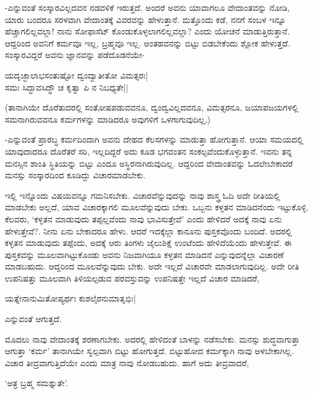 -ಎನ್ನುವಂತೆ ಸಂಸ್ಕಾರವಿಲ್ಲದವನ ನಡವಳಿಕೆ ಇರುತ್ತದೆ. ಅಂದರೆ ಅವನು ಯಾವಾಗಲೂ ವೇದಾಂತವನ್ನು ನೋಡಿ, ಯಾರು ಬಂದರೂ ಸರಳವಾಗಿ ವೇದಾಂತಕ್ಕೆ ವಿವರವನ್ನು ಹೇಳುತ್ತಾನೆ. ಮತ್ತೊಂದು ಕಡೆ, ನನಗೆ ಸಂಬಳ ಇನ್ನೂ ಹೆಚ್ಚಾಗಲಿಲ್ಲವಲ್ಲಾ! ನಾನು ಸೋಫಾಸೆಟ್ ಕೊಂಡುಕೊಳ್ಳಲಾಗಲಿಲ್ಲವಲ್ಲಾ? ಎಂದು ಯೋಚನೆ ಮಾಡುತ್ತಿರುತ್ತಾನೆ. ಆದ್ದರಿಂದ ಅವನಿಗೆ ಕರ್ಮವೂ ಇಲ್ಲ, ಬ್ರಹ್ಮವೂ ಇಲ್ಲ. ಅಂತಹವನನ್ನು ಬಿಟ್ಟು ಬಿಡಬೇಕೆಂದು ಶ್ಲೋಕ ಹೇಳುತ್ತದೆ. ಸಂಸ್ಕಾರವಿದ್ದರೆ ಅವನು ಜ್ಞಾನವನ್ನು ಪಡೆದೊಡನೆಯೇ-

\begin{shloka}
ಯದೃಚ್ಛಾಲಾಭಸಂತುಷ್ಟೋ ದ್ವಂದ್ವಾತೀತೋ ವಿಮತ್ಸರಃ|\\
ಸಮಃ ಸಿದ್ಧಾವಸಿದ್ಧೌ ಚ ಕೃತ್ವಾ ಪಿ ನ ನಿಬಧ್ಯತೇ||
\end{shloka}

(ತಾನಾಗಿಯೇ ದೊರೆತುದರಲ್ಲಿ ಸಂತೋಷಪಡುವವನೂ, ದ್ವಂದ್ವವಿಲ್ಲದವನೂ, ವಿಮತ್ಸರನೂ, ಜಯಾಪಜಯಗಳಲ್ಲಿ ಸಮನಾಗಿರುವವನೂ ಕರ್ಮಗಳನ್ನು ಮಾಡಿದರೂ ಅವುಗಳಿಗೆ ಒಳಗಾಗುವುದಿಲ್ಲ,)

-ಎನ್ನುವಂತೆ ಪ್ರಾರಬ್ಧ ಕರ್ಮದಿಂದಾಗಿ ಅವನು ದೇಹದ ಕೆಲಸಗಳನ್ನು ಮಾಡುತ್ತಾ ಹೋಗುತ್ತಾನೆ. ಆಯಾ ಸಮಯದಲ್ಲಿ ಯಾವುದಾದರೂ ದೊರೆತರೆ ಸರಿ, ಇಲ್ಲದಿದ್ದರೆ ಅದು ಕೂಡ ಭಗವಂತನ ಸಂಕಲ್ಪವೆಂದುಕೊಳ್ಳುತ್ತಾನೆ. ಇವನು ತನ್ನ ಮನಸ್ಸಿನ ಶಾಂತಿ ಸ್ಥಿತಿಯನ್ನು ಬಿಟ್ಟು ಎಂದೂ ಅಸ್ಥಿರನಾಗಿರುವುದಿಲ್ಲ. ಆದ್ದರಿಂದ ವೇದಾಂತವನ್ನು ಓದಲೇಬೇಕಾದರೆ ಮನಸ್ಸು ಸಂಸ್ಕಾರದಿಂದ ಕೂಡಿದ್ದು ವಿಚಾರಮಾಡಬೇಕು.

ಇಲ್ಲಿ ಇನ್ನೊಂದು ವಿಷಯವನ್ನೂ ಗಮನಿಸಬೇಕು. ವಿಚಾರವೆನ್ನುವುದನ್ನು ನಾವು ಶಾಸ್ತ್ರ ಓದಿ ಅದೇ ರೀತಿಯಲ್ಲಿ ಮಾಡಬೇಕು ಅಲ್ಲದೆ, ಯಾವ ವಿಚಾರಕ್ಕಾಗಲಿ ಮೂಲವೆನ್ನುವುದು ಬೇಕು. ಒಬ್ಬನು ಕಳ್ಳತನ ಮಾಡಿದನೆಂದು ಇಟ್ಟುಕೊಳ್ಳಿ. ಕೆಲವರು, `ಕಳ್ಳತನ ಮಾಡುವುದು ತಪ್ಪಲ್ಲವೆಂದು ನಾವು ಭಾವಿಸುತ್ತೇವೆ' ಎಂದು ಹೇಳಿದರೆ ಅದಕ್ಕೆ ನಾವು ಏನು ಹೇಳುತ್ತೇವೆ?. ನೀನು ಏನು ಬೇಕಾದರೂ ಹೇಳು. ಆದರೆ ಇದಕ್ಕೆಲ್ಲಾ ಕಾನೂನು ಪುಸ್ತಕವೊಂದು ಬಂದಿದೆ. ಅದರಲ್ಲಿ ಕಳ್ಳತನ ಮಾಡುವುದು ತಪ್ಪೆಂದು, ಅದಕ್ಕೆ ಆರು ತಿಂಗಳು ಜೈಲುಶಿಕ್ಷೆ ಉಂಟೆಂದು ಹೇಳಿದೆಯೆಂದು ಹೇಳುತ್ತೇವೆ. ಈ ಪುಸ್ತಕವನ್ನು ಮೂಲವಾಗಿಟ್ಟುಕೊಂಡು ಅವನು ನಿಜವಾಗಿಯೂ ಕಳ್ಳತನ ಮಾಡಿದನೆ ಎನ್ನುವುದನ್ನೆಲ್ಲಾ ವಿಚಾರಣೆ ಮಾಡಬಹುದು. ಆದ್ದರಿಂದ ಮೂಲವೆನ್ನುವುದು ಬೇಕು. ಅದೇ ಇಲ್ಲದೆ ವಿಚಾರವೇ ಮಾಡಲಾಗುವುದಿಲ್ಲ. ಅದೇ ರೀತಿ ಉಪನಿಷತ್ತು ಮೂಲವಾಗಿ ತಿಳಿಯಲ್ಪಡುವ ಪರವಸ್ತುವನ್ನು ಉಪನಿಷತ್ತೇ ಇಲ್ಲದೆ ವಿಚಾರ ಮಾಡಿದರೆ,

\begin{shloka}
ಯತ್ನೇನಾನುಮಿತೋಪ್ಯರ್ಥಃ ಕುಶಲೈರನುಮಾತೃಭಿಃ|
\end{shloka}

ಎನ್ನುವಂತೆ ಆಗುತ್ತದೆ.

ಮೊದಲು ನಾವು ವೇದಾಂತಕ್ಕೆ ಶರಣಾಗಬೇಕು. ಅದರಲ್ಲಿ ಹೇಳಿದಂತೆ ಬಾಳನ್ನು ನಡೆಸಬೇಕು. ಮನಸ್ಸು ಶುದ್ಧವಾಗುತ್ತಾ ಆಗುತ್ತಾ `ಕರ್ಮ' ತಾನಾಗಿಯೇ ಸ್ವಲ್ಪವಾಗಿ ಬಿಟ್ಟು ಹೋಗುತ್ತದೆ. ಬಿಟ್ಟುಹೋದ ಕರ್ಮಕ್ಕಾಗಿ ನಾವು ಅಳಬೇಕಾಗಿಲ್ಲ. ವಿಚಾರ ತೀವ್ರವಾಗುತ್ತಿದೆಯೇ ಎಂದು ಮಾತ್ರ ನಾವು ನೋಡಬಹುದು. ಹಾಗೆ ಅದು ತೀವ್ರವಾದರೆ,

\begin{shloka}
`ಅತ್ರ ಬ್ರಹ್ಮ ಸಮಶ್ನುತೇ'.
\end{shloka}


